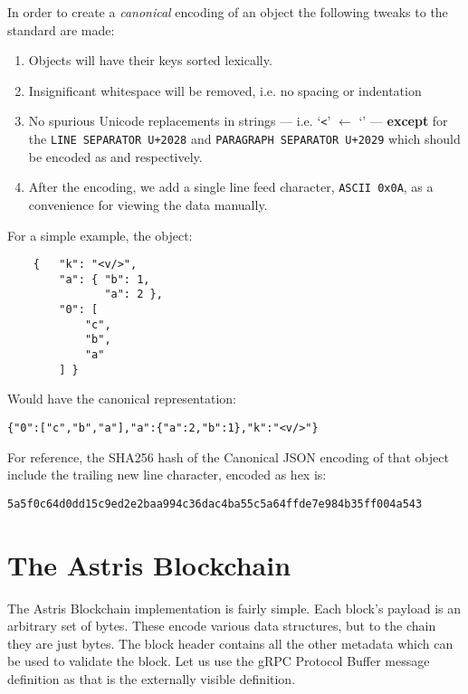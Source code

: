 In order to create a \emph{canonical} encoding of an object the following tweaks to the standard are made:

\begin{enumerate}
    \item Objects will have their keys sorted lexically.
    \item Insignificant whitespace will be removed, i.e. no spacing or indentation
    \item No spurious Unicode replacements in strings --- i.e. `\texttt{<}' $\leftarrow$ `\texttt{}' --- \textbf{except} for the \texttt{LINE SEPARATOR U+2028} and \texttt{PARAGRAPH SEPARATOR U+2029} which should be encoded as \texttt{} and \texttt{} respectively.
    \item After the encoding, we add a single line feed character, \texttt{ASCII 0x0A}, as a convenience for viewing the data manually.
\end{enumerate}

For a simple example, the object:

\begin{verbatim}
    {   "k": "<v/>",
        "a": { "b": 1,
               "a": 2 },
        "0": [
            "c",
            "b",
            "a"
        ] }
\end{verbatim}

Would have the canonical representation:

\begin{verbatim}
{"0":["c","b","a"],"a":{"a":2,"b":1},"k":"<v/>"}
\end{verbatim}

For reference, the SHA256 hash of the Canonical JSON encoding of that object include the trailing new line character, encoded as hex is:

\begin{center}
    \texttt{5a5f0c64d0dd15c9ed2e2baa994c36dac4ba55c5a64ffde7e984b35ff004a543}
\end{center}





\chapter{The Astris Blockchain}
\label{appendix:blockchain}

The Astris Blockchain implementation is fairly simple. Each block's payload is an arbitrary set of bytes. These encode various data structures, but to the chain they are just bytes. The block header contains all the other metadata which can be used to validate the block. Let us use the gRPC Protocol Buffer message definition as that is the externally visible definition.

